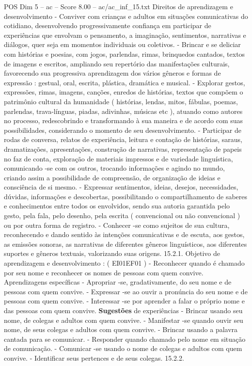 \begin{textsample}{POS Dim 5 – ac – Score 8.00 – ac/ac\_inf\_15.txt}
Direitos de aprendizagem e desenvolvimento - Conviver com crianças e adultos em situações comunicativas do cotidiano, desenvolvendo progressivamente confiança em participar de experiências que envolvam o pensamento, a imaginação, sentimentos, narrativas e diálogos, quer seja em momentos individuais ou coletivos. - Brincar e se deliciar com histórias e poesias, com jogos, parlendas, rimas, brinquedos cantados, textos de imagens e escritos, ampliando seu repertório das manifestações culturais, favorecendo sua progressiva aprendizagem dos vários gêneros e formas de expressão : gestual, oral, escrita, plástica, dramática e musical. - Explorar gestos, expressões, rimas, imagens, canções, enredos de histórias, textos que compõem o patrimônio cultural da humanidade ( histórias, lendas, mitos, fábulas, poemas, parlendas, trava-línguas, piadas, adivinhas, músicas etc ), atuando como autores no processo, redescobrindo e transformando à sua maneira e de acordo com suas possibilidades, considerando o momento de seu desenvolvimento. - Participar de rodas de conversa, relatos de experiência, leitura e contação de histórias, saraus, dramatizações, apresentações, construção de narrativas, representação de papeis no faz de conta, exploração de materiais impressos e de variedade linguística, comunicando -se com os outros, trocando informações e agindo no mundo, criando assim a possibilidade de compreensão, de organização de ideias e consciência de si mesmo. - Expressar sentimentos, ideias, desejos, necessidades, dúvidas, informações e descobertas, possibilitando o compartilhamento de saberes e conhecimentos entre todos os envolvidos, sendo sua autoria garantida pelo gesto, pela fala, pelo desenho, pela escrita ( convencional ou não convencional ) ou por outra forma de registro. - Conhecer -se como sujeitos de sua cultura, reconhecendo e dando sentido às intenções comunicativas e de escuta, aos gestos, as emissões sonoras, as narrativas de diferentes gêneros linguísticos, aos diferentes suportes e gêneros textuais, valorizando suas origens. 15.2.1.
Objetivo de aprendizagem e desenvolvimento : ( EI01EF01 ) - Reconhecer quando é chamado por seu nome e reconhecer os nomes de pessoas com quem convive.
Aprendizagens específicas - Apropriar -se, gradativamente, do seu nome e de pessoas com quem convive. - Expressar -se ao ouvir a pronúncia do seu nome e de pessoas com quem convive. - Interessar -se por aprender a falar o próprio nome e das pessoas com quem convive. \textbf{Sugestões} de experiências - Brincar usando seu nome, de colegas e adultos com quem convive. - Manifestar -se quando ouvir seu nome, de seus colegas e adultos com quem convive. - Brincar usando a palavra cantada para se comunicar. - Responder quando chamado pelo nome em situação de comunicação. - Comunicar -se usando o nome de colegas e adultos com quem convive. - Identificar seus pertences e de seus colegas. 15.2.2.

\end{textsample}
